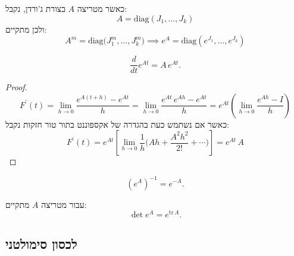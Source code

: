 \documentclass{tstextbook}
\begin{document}
\begin{proposition}
כאשר מטריצה \(A\) בצורת ג'ורדן, נקבל:
$$A=\mathrm{diag}(J_{1},\ldots,J_{k})$$
ולכן מתקיים:
$$A^{m}=\mathrm{diag}\bigl(J_{1}^{m},\ldots,J_{k}^{m}\bigr)\implies e^{A}=\mathrm{diag}(e^{J_{1}},\ldots,e^{J_{k}})$$

\end{proposition}
\begin{proposition}
$${\frac{d}{d t}}e^{A t}=A\,e^{A t}.$$

\end{proposition}
\begin{proof}
$$F^{\prime}(t)=\operatorname*{lim}_{h\to0}{\frac{e^{A(t+h)}-e^{A t}}{h}}=\operatorname*{lim}_{h\to0}{\frac{e^{A t}\,e^{A h}-e^{A t}}{h}}=e^{A t}\left(\operatorname*{lim}_{h\to0}{\frac{e^{A h}-I}{h}}\right)$$
כאשר אם נשתמש כעת בהגדרה של אקספוננט בתור טור חזקות נקבל:
$$F^{\prime}(t)=e^{A t}\left[\operatorname*{lim}_{h\to0}{\frac{1}{h}}\Big(A h+{\frac{A^{2}h^{2}}{2!}}+\cdots\Big)\right]=e^{A t}\,A$$

\end{proof}
\begin{proposition}
$$\left(e^{A}\right)^{-1}=e^{-A}.$$

\end{proposition}
\begin{proposition}
עבור מטריצה \(A\) מתקיים:
$$\operatorname*{det}e^{A}=e^{\mathrm{tr}\,A}.$$

\end{proposition}
\subsection{לכסון סימולטני}
\end{document}
